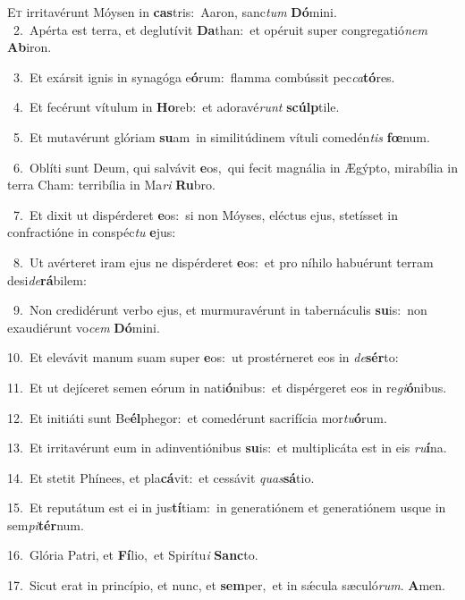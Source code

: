\lettrine{\initial\textcolor{\initialcolor}{E}}{t} irritavérunt Móysen in \textbf{cas}\-tris:~\star Aaron, sanc\textit{tum} \textbf{Dó}\-mini.\\
{\numbfont\textcolor{\numbcolor}{~2.}}~Apérta est terra, et deglutívit \textbf{Da}\-than:~\star et opéruit super congregatió\textit{nem} \textbf{Ab}\-iron.\par
{\numbfont\textcolor{\numbcolor}{~3.}}~Et exársit ignis in synagóga e\-\textbf{ó}\-rum:~\star flamma combússit pec\-\textit{ca}\-\textbf{tó}res.\par
{\numbfont\textcolor{\numbcolor}{~4.}}~Et fecérunt vítulum in \textbf{Ho}\-reb:~\star et adoravé\textit{runt} \textbf{scúlp}\-tile.\par
{\numbfont\textcolor{\numbcolor}{~5.}}~Et mutavérunt glóriam \textbf{su}\-am~\star in similitúdinem vítuli comedén\textit{tis} \textbf{fœ}\-num.\par
{\numbfont\textcolor{\numbcolor}{~6.}}~Oblíti sunt Deum, qui salvávit \textbf{e}\-os,~\star qui fecit magnália in Ægýpto, mirabília in terra Cham: terribília in Ma\textit{ri} \textbf{Ru}\-bro.\par
{\numbfont\textcolor{\numbcolor}{~7.}}~Et dixit ut dispérderet \textbf{e}\-os:~\star si non Móyses, eléctus ejus, stetísset in confractióne in conspéc\textit{tu} \textbf{e}\-jus:\par
{\numbfont\textcolor{\numbcolor}{~8.}}~Ut avérteret iram ejus ne dispérderet \textbf{e}\-os:~\star et pro níhilo habuérunt terram desi\-\textit{de}\-\textbf{rá}bilem:\par
{\numbfont\textcolor{\numbcolor}{~9.}}~Non credidérunt verbo ejus, et murmuravérunt in tabernáculis \textbf{su}\-is:~\star non exaudiérunt vo\textit{cem} \textbf{Dó}\-mini.\par
{\numbfont\textcolor{\numbcolor}{10.}}~Et elevávit manum suam super \textbf{e}\-os:~\star ut prostérneret eos in \textit{de}\-\textbf{sér}to:\par
{\numbfont\textcolor{\numbcolor}{11.}}~Et ut dejíceret semen eórum in nati\-\textbf{ó}\-nibus:~\star et dispérgeret eos in re\-\textit{gi}\-\textbf{ó}nibus.\par
{\numbfont\textcolor{\numbcolor}{12.}}~Et initiáti sunt Be\-\textbf{él}\-phegor:~\star et comedérunt sacrifícia mor\-\textit{tu}\-\textbf{ó}rum.\par
{\numbfont\textcolor{\numbcolor}{13.}}~Et irritavérunt eum in adinventiónibus \textbf{su}\-is:~\star et multiplicáta est in eis \textit{ru}\-\textbf{í}na.\par
{\numbfont\textcolor{\numbcolor}{14.}}~Et stetit Phínees, et pla\-\textbf{cá}\-vit:~\star et cessávit \textit{quas}\-\textbf{sá}tio.\par
{\numbfont\textcolor{\numbcolor}{15.}}~Et reputátum est ei in jus\-\textbf{tí}\-tiam:~\star in generatiónem et generatiónem usque in sem\-\textit{pi}\-\textbf{tér}num.\par
{\numbfont\textcolor{\numbcolor}{16.}}~Glória Patri, et \textbf{Fí}\-lio,~\star et Spirítu\textit{i} \textbf{Sanc}\-to.\par
{\numbfont\textcolor{\numbcolor}{17.}}~Sicut erat in princípio, et nunc, et \textbf{sem}\-per,~\star et in sǽcula sæculó\-\textit{rum}\-. \textbf{A}\-men.\par

